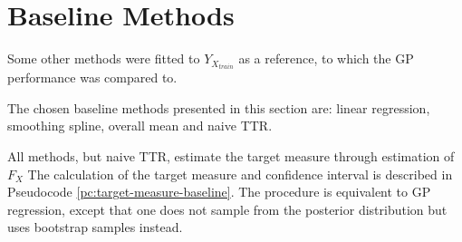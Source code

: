 \section{Baseline Methods}\label{sec:baseline-methods}

Some other methods were fitted to $Y_{X_{train}}$ as a reference, to which
the GP performance was compared to.

The chosen baseline methods presented in this section are: linear regression,
smoothing spline, overall mean and naive TTR.

All methods, but naive TTR, estimate the target measure through estimation of $F_X$
The calculation of the target measure and confidence interval is described in
Pseudocode \ref{pc:target-measure-baseline}.
The procedure is equivalent to GP regression, except that one does not sample from
the posterior distribution but uses bootstrap samples instead.


